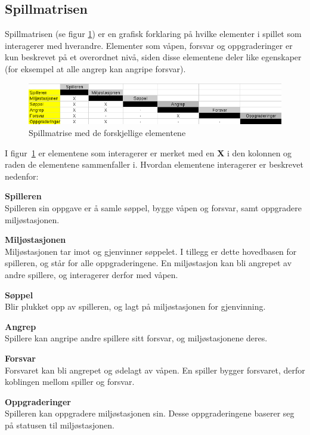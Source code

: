 \subsection{Spillmatrisen}
Spillmatrisen (se figur \ref{fig:spillmatrise}) er en grafisk forklaring
på hvilke elementer i spillet som interagerer med hverandre. Elementer
som våpen, forsvar og oppgraderinger er kun beskrevet på et overordnet
nivå, siden disse elementene deler like egenskaper (for eksempel at alle
angrep kan angripe forsvar).
\begin{center}
\begin{figure} [H]
\includegraphics[scale=0.6]{images/spillmatrise.png}
\caption{Spillmatrise med de forskjellige elementene}
\label{fig:spillmatrise}
\end{figure}
\end{center}
I figur~\ref{fig:spillmatrise} er elementene som interagerer er merket
med en \textbf{X} i den kolonnen og raden de elementene sammenfaller i.
Hvordan elementene interagerer er beskrevet nedenfor:
\begin{description}
\item \textbf{Spilleren}\\Spilleren sin oppgave er å samle søppel,
bygge våpen og forsvar, samt oppgradere miljøstasjonen.
\item \textbf{Miljøstasjonen}\\Miljøstasjonen tar imot og gjenvinner
søppelet. I tillegg er dette hovedbasen for spilleren, og står for alle
oppgraderingene. En miljøstasjon kan bli angrepet av andre spillere, og
interagerer derfor med våpen.
\item \textbf{Søppel}\\Blir plukket opp av spilleren, og lagt på
miljøstasjonen for gjenvinning.
\item \textbf{Angrep}\\Spillere kan angripe andre spillere sitt forsvar,
og miljøstasjonene deres.
\item \textbf{Forsvar}\\Forsvaret kan bli angrepet og ødelagt av våpen.
En spiller bygger forsvaret, derfor koblingen mellom spiller og forsvar.
\item \textbf{Oppgraderinger}\\Spilleren kan oppgradere miljøstasjonen
sin. Desse oppgraderingene baserer seg på statusen til miljøstasjonen.
\end{description}

